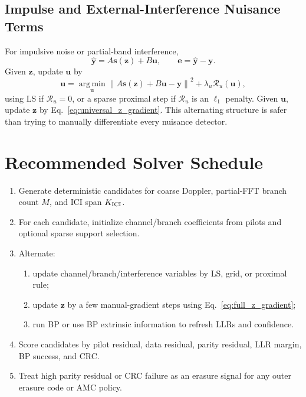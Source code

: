 \documentclass[11pt]{article}
\newcommand{\norm}[1]{\left\lVert #1 \right\rVert}
\newcommand{\argmin}{\operatorname*{arg\,min}}
\begin{document}
\subsection{Impulse and External-Interference Nuisance Terms}

For impulsive noise or partial-band interference,
\begin{equation}
  \widehat{\bm y}=A\bm s(\bm z)+B\bm u,\qquad
  \bm e=\widehat{\bm y}-\bm y.
\end{equation}
Given $\bm z$, update $\bm u$ by
\begin{equation}
  \bm u
  =
  \argmin_{\bm u}\norm{A\bm s(\bm z)+B\bm u-\bm y}^2
  +\lambda_u\mathcal R_u(\bm u),
\end{equation}
using LS if $\mathcal R_u=0$, or a sparse proximal step if $\mathcal R_u$ is an
$\ell_1$ penalty.  Given $\bm u$, update $\bm z$ by
Eq.~\eqref{eq:universal_z_gradient}.  This alternating structure is safer than
trying to manually differentiate every nuisance detector.

\section{Recommended Solver Schedule}

\begin{enumerate}
  \item Generate deterministic candidates for coarse Doppler, partial-FFT
  branch count $M$, and ICI span $K_{\rm ICI}$.
  \item For each candidate, initialize channel/branch coefficients from pilots
  and optional sparse support selection.
  \item Alternate:
  \begin{enumerate}
    \item update channel/branch/interference variables by LS, grid, or proximal
    rule;
    \item update $\bm z$ by a few manual-gradient steps using
    Eq.~\eqref{eq:full_z_gradient};
    \item run BP or use BP extrinsic information to refresh LLRs and confidence.
  \end{enumerate}
  \item Score candidates by pilot residual, data residual, parity residual,
  LLR margin, BP success, and CRC.
  \item Treat high parity residual or CRC failure as an erasure signal for any
  outer erasure code or AMC policy.
\end{enumerate}
\end{document}
